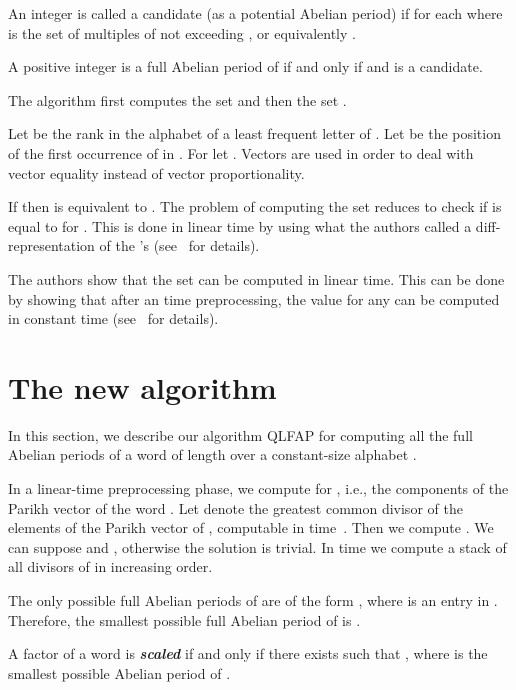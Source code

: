 \documentclass[3p]{elsarticle}
\def\itbf#1{\textit{\textbf{#1}}}
\begin{document}
An integer  is called a candidate (as a potential Abelian period) if
  for each  where  is the set
  of multiples of  not exceeding , or equivalently
 .

A positive integer  is a full Abelian period of 
 if and only if  and  is a candidate.

The algorithm first computes the set  and
 then the set
 .

 
Let  be the rank in the alphabet of a least frequent letter  of .
Let  be the position of the first occurrence of  in .
For  let 
 .
Vectors  are used in order to deal with vector equality
 instead of vector proportionality.

If  then  is equivalent to 
 .
The problem of computing the set 
 reduces to check if 
 is equal to  for .
This is done in linear time by using what the authors called
 a diff-representation of the 's (see~\cite{KoRaRy13}
 for details).

The authors show that the set  can be computed
 in linear time.
This can be done by showing that after an  time preprocessing,
 the value  for any  can be computed
 in constant time (see~\cite{KoRaRy13}
 for details).
 
 
\section{The new algorithm}\label{sec-nohead-notail}


In this section, we describe our algorithm QLFAP for computing all the full Abelian periods of a word  of length  over a constant-size alphabet .

In a linear-time preprocessing phase, we compute  for , 
 i.e., the components of the Parikh vector of the word .
Let  denote the greatest common divisor of the
 elements of the Parikh vector of , computable in
  time~\cite{Bradley1970}.
Then we compute .
We can suppose  and , otherwise the solution is trivial.
In  time we compute a stack  of all divisors  of 
 in increasing order. 

\begin{obs}
\label{obs-poss}
The only possible full Abelian periods of 
 are of the form , where  is an entry in .
Therefore, the smallest possible full Abelian period of  is .
\end{obs}

\begin{defi}[scaled]
\label{def-scaled}
A factor  of a word  is \itbf{scaled} if and only if there exists  such that , where  is
 the smallest possible Abelian period of .
\end{defi}
\end{document}
